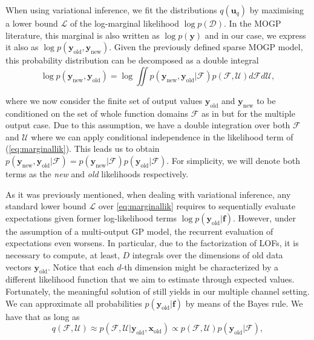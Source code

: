 \documentclass[]{article}
\def\u{{\mathbf u}}
\def\f{{\mathbf f}}
\newcommand{\Fcal}{\mathcal{F}}
\newcommand{\Ucal}{\mathcal{U}}
\newcommand{\Dcal}{\mathcal{D}}
\newcommand{\Lcal}{\mathcal{L}}
\newcommand{\xc}{\bm{x}}
\newcommand{\yc}{\bm{y}}
\newcommand{\ycnew}{{\yc_{\text{new}}}}
\newcommand{\ycold}{{\yc_{\text{old}}}}
\begin{document}
When using variational inference, we fit the distributions $q(\u_q)$ by maximising a lower bound $\Lcal$ of the log-marginal likelihood $\log p(\Dcal)$. In the MOGP literature, this marginal is also written as $\log p(\yc)$ and in our case, we express it also as $\log p(\ycold, \ycnew)$. Given the previously defined sparse MOGP model, this probability distribution can be decomposed as a double integral
\begin{equation}
\label{eq:marginallik}
\log p(\ycnew, \ycold) = \log \iint p(\ycnew, \ycold|\Fcal)p(\Fcal, \Ucal)d\Fcal d\Ucal,
\end{equation}

where we now consider the finite set of output values $\ycold$ and $\ycnew$ to be conditioned on the set of whole function domains $\Fcal$ as in \citet{bui2017streaming} but for the multiple output case. Due to this assumption, we have a double integration over both $\Fcal$ and $\Ucal$ where we can apply conditional independence in the likelihood term of (\ref{eq:marginallik}). This leads us to obtain $p(\ycnew, \ycold|\Fcal) = p(\ycnew|\Fcal)p(\ycold|\Fcal)$. For simplicity, we will denote both terms as the \textit{new} and \textit{old} likelihoods respectively.

As it was previously mentioned, when dealing with variational inference, any standard lower bound $\Lcal$ over \eqref{eq:marginallik} requires to sequentially evaluate expectations given former log-likelihood terms $\log p(\ycold|\f)$. However, under the assumption of a multi-output GP model, the recurrent evaluation of expectations even worsens. In particular, due to the factorization of LOFs,  it is necessary to compute, at least, $D$ integrals over the dimensions of old data vectors $\ycold$. Notice that each $d$-th  dimension might be characterized by a different likelihood function that we aim to estimate through expected values. Fortunately, the meaningful solution of \citet{bui2017streaming} still yields in our multiple channel setting. We can approximate all probabilities $p(\ycold|\f)$ by means of the Bayes rule. We have that as long as 
\begin{equation}
q(\Fcal, \Ucal) \approx p(\Fcal, \Ucal|\ycold, \xc_{\text{old}}) \propto p(\Fcal, \Ucal)p(\ycold|\Fcal),
\end{equation}
\end{document}
